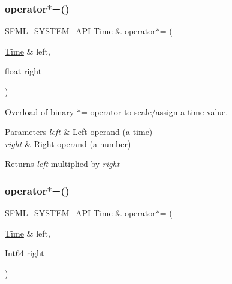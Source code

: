 \subsubsection{\texorpdfstring{operator$\ast$=()}{operator*=()}\hspace{0.1cm}{\footnotesize\ttfamily [1/2]}}
{\footnotesize\ttfamily S\+F\+M\+L\+\_\+\+S\+Y\+S\+T\+E\+M\+\_\+\+A\+PI \mbox{\hyperlink{classsf_1_1_time}{Time}} \& operator$\ast$= (\begin{DoxyParamCaption}\item[{\mbox{\hyperlink{classsf_1_1_time}{Time}} \&}]{left,  }\item[{float}]{right }\end{DoxyParamCaption})\hspace{0.3cm}{\ttfamily [related]}}



Overload of binary $\ast$= operator to scale/assign a time value. 


\begin{DoxyParams}{Parameters}
{\em left} & Left operand (a time) \\
\hline
{\em right} & Right operand (a number)\\
\hline
\end{DoxyParams}
\begin{DoxyReturn}{Returns}
{\itshape left} multiplied by {\itshape right} \begin{DoxyVerb}\end{DoxyVerb}
 
\end{DoxyReturn}
\mbox{\label{classsf_1_1_time_a6656a0a1a1802009a72d93fbba61f24a}} 
\subsubsection{\texorpdfstring{operator$\ast$=()}{operator*=()}\hspace{0.1cm}{\footnotesize\ttfamily [2/2]}}
{\footnotesize\ttfamily S\+F\+M\+L\+\_\+\+S\+Y\+S\+T\+E\+M\+\_\+\+A\+PI \mbox{\hyperlink{classsf_1_1_time}{Time}} \& operator$\ast$= (\begin{DoxyParamCaption}\item[{\mbox{\hyperlink{classsf_1_1_time}{Time}} \&}]{left,  }\item[{Int64}]{right }\end{DoxyParamCaption})\hspace{0.3cm}{\ttfamily [related]}}



